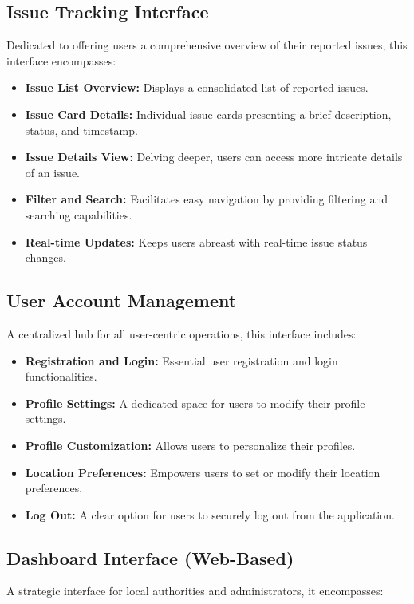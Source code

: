 \subsection{Issue Tracking Interface}
    Dedicated to offering users a comprehensive overview of their reported issues, this interface encompasses:
    
    \begin{itemize}
        \item \textbf{Issue List Overview:} Displays a consolidated list of reported issues.
        \item \textbf{Issue Card Details:} Individual issue cards presenting a brief description, status, and timestamp.
        \item \textbf{Issue Details View:} Delving deeper, users can access more intricate details of an issue.
        \item \textbf{Filter and Search:} Facilitates easy navigation by providing filtering and searching capabilities.
        \item \textbf{Real-time Updates:} Keeps users abreast with real-time issue status changes.
    \end{itemize}

\subsection{User Account Management}
    A centralized hub for all user-centric operations, this interface includes:
    
    \begin{itemize}
        \item \textbf{Registration and Login:} Essential user registration and login functionalities.
        \item \textbf{Profile Settings:} A dedicated space for users to modify their profile settings.
        \item \textbf{Profile Customization:} Allows users to personalize their profiles.
        \item \textbf{Location Preferences:} Empowers users to set or modify their location preferences.
        \item \textbf{Log Out:} A clear option for users to securely log out from the application.
    \end{itemize}

\subsection{Dashboard Interface (Web-Based)}
    A strategic interface for local authorities and administrators, it encompasses:
    
